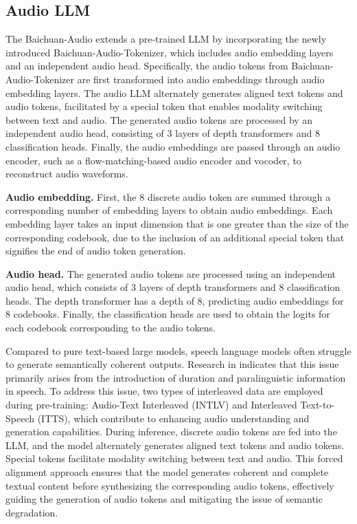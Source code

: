 \subsection{Audio LLM}
\par The Baichuan-Audio extends a pre-trained LLM by incorporating the newly introduced Baichuan-Audio-Tokenizer, which includes audio embedding layers and an independent audio head. Specifically, the audio tokens from Baichuan-Audio-Tokenizer are first transformed into audio embeddings through audio embedding layers. The audio LLM alternately generates aligned text tokens and audio tokens, facilitated by a special token that enables modality switching between text and audio. The generated audio tokens are processed by an independent audio head, consisting of 3 layers of depth transformers and 8 classification heads. Finally, the audio embeddings are passed through an audio encoder, such as a flow-matching-based audio encoder and vocoder, to reconstruct audio waveforms. 

\textbf{Audio embedding.}
First, the 8 discrete audio token are summed through a corresponding number of embedding layers to obtain audio embeddings. Each embedding layer takes an input dimension that is one greater than the size of the corresponding codebook, due to the inclusion of an additional special token that signifies the end of audio token generation.

\textbf{Audio head.}
The generated audio tokens are processed using an independent audio head, which consists of 3 layers of depth transformers and 8 classification heads. The depth transformer has a depth of 8, predicting audio embeddings for 8 codebooks. Finally, the classification heads are used to obtain the logits for each codebook corresponding to the audio tokens.



Compared to pure text-based large models, speech language models often struggle to generate semantically coherent outputs. Research in \cite{wang2024speech} indicates that this issue primarily arises from the introduction of duration and paralinguistic information in speech. To address this issue, two types of interleaved data are employed during pre-training: Audio-Text Interleaved (INTLV) and Interleaved Text-to-Speech (ITTS), which contribute to enhancing audio understanding and generation capabilities. During inference, discrete audio tokens are fed into the LLM, and the model alternately generates aligned text tokens and audio tokens. Special tokens facilitate modality switching between text and audio. This forced alignment approach ensures that the model generates coherent and complete textual content before synthesizing the corresponding audio tokens, effectively guiding the generation of audio tokens and mitigating the issue of semantic degradation.


